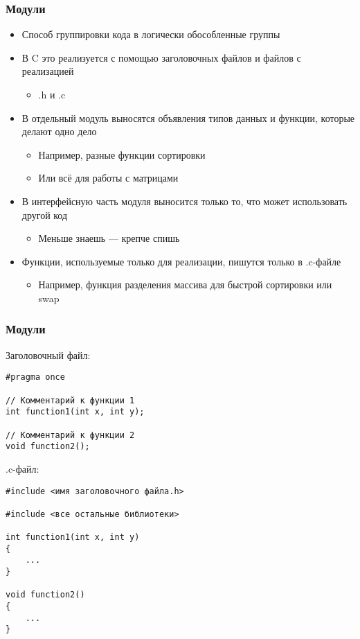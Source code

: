 \documentclass[xetex,mathserif,serif]{beamer}
\begin{document}
    \begin{frame}[fragile]
        \frametitle{Модули}
        \begin{itemize}
            \item Способ группировки кода в логически обособленные группы
            \item В C это реализуется с помощью заголовочных файлов и файлов с реализацией
            \begin{itemize}
                \item .h и .c
            \end{itemize}
            \item В отдельный модуль выносятся объявления типов данных и функции, которые делают одно дело
            \begin{itemize}
                \item Например, разные функции сортировки
                \item Или всё для работы с матрицами
            \end{itemize}
            \item В интерфейсную часть модуля выносится только то, что может использовать другой код
            \begin{itemize}
                \item Меньше знаешь --- крепче спишь
            \end{itemize}
            \item Функции, используемые только для реализации, пишутся только в .c-файле
            \begin{itemize}
                \item Например, функция разделения массива для быстрой сортировки или swap
            \end{itemize}
        \end{itemize}
    \end{frame}

    \begin{frame}[fragile]
        \frametitle{Модули}
        \begin{scriptsize}
            Заголовочный файл:
            \begin{verbatim}
#pragma once

// Комментарий к функции 1
int function1(int x, int y);

// Комментарий к функции 2
void function2();
            \end{verbatim}
            .c-файл:
            \begin{verbatim}
#include <имя заголовочного файла.h>

#include <все остальные библиотеки>

int function1(int x, int y)
{
    ...
}

void function2()
{
    ...
}
            \end{verbatim}
        \end{scriptsize}
    \end{frame}
\end{document}
